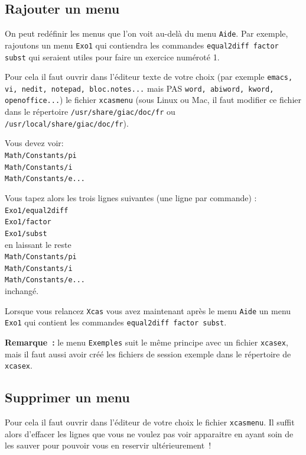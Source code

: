 \documentclass[a4paper,11pt]{article}
\begin{document}
\subsection{Rajouter un menu} \label{sec:xcasmenu}
On peut red\'efinir les menus que l'on voit au-del\`a du menu {\tt  Aide}.
Par exemple, rajoutons un menu {\tt Exo1} qui contiendra les 
commandes {\tt equal2diff factor subst} 
qui seraient utiles pour faire un exercice num\'erot\'e 1.

Pour cela il faut ouvrir dans l'\'editeur texte de votre choix (par exemple
{\tt emacs, vi, nedit, notepad, bloc.notes...} mais PAS
{\tt word, abiword, kword, openoffice...}) le fichier {\tt xcasmenu}
(sous Linux ou Mac, il faut modifier ce fichier
dans le r\'epertoire \verb|/usr/share/giac/doc/fr| ou\\
\verb|/usr/local/share/giac/doc/fr|).

Vous devez voir:\\
{\tt Math/Constants/pi\\
Math/Constants/i\\
Math/Constants/e...}

Vous tapez alors les trois lignes suivantes (une ligne par commande) :\\
{\tt Exo1/equal2diff\\
Exo1/factor\\
Exo1/subst}\\
en laissant le reste\\ 
{\tt Math/Constants/pi\\
Math/Constants/i\\
Math/Constants/e...}\\
inchang\'e.

Lorsque vous relancez {\tt Xcas} vous avez maintenant apr\`es le menu 
{\tt Aide} un menu {\tt Exo1} qui contient les commandes 
{\tt equal2diff factor subst}.

{\bf Remarque~:} le menu {\tt Exemples} suit le m\^eme principe avec
un fichier {\tt xcasex}, mais il faut aussi avoir cr\'e\'e les
fichiers de session exemple dans le r\'epertoire de {\tt xcasex}.

\subsection{Supprimer un menu}
Pour cela il faut ouvrir dans l'\'editeur de votre choix le fichier 
{\tt xcasmenu}.
Il suffit alors d'effacer les lignes que vous ne voulez pas voir apparaitre
en ayant soin de les sauver pour pouvoir vous en reservir
ult\'erieurement~!
\end{document}

